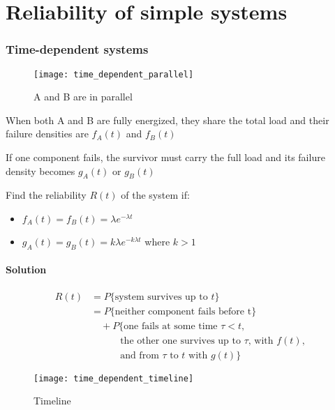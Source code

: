 
\chapter{Reliability of simple systems}

\subsection{Time-dependent systems}
\begin{figure}[!htp]
    \centering
    \texttt{[image: time\_dependent\_parallel]}
    \caption{A and B are in parallel}
\end{figure}

When both A and B are fully energized, they share the total load and their
failure densities are $f_A(t)$ and $f_B(t)$

If one component fails, the survivor must carry the full load and its failure
density becomes $g_A(t)$ or $g_B(t)$

Find the reliability $R(t)$ of the system if:  
\begin{itemize}[noitemsep,topsep=1ex]
    \item $f_A(t)=f_B(t) = \lambda e^{-\lambda t}$
    \item $g_A(t)=g_B(t)=k\lambda e^{-k\lambda t}$
    where $k>1$
\end{itemize}

\subsubsection*{Solution}
\begin{equation*}
    \begin{split}
        R(t) & = P\{\text{system survives up to $t$}\} \\
        &= P\{\text{neither component fails before t}\} \\
        &\quad+ P\{\text{one fails at some time $\tau<t$,} \\
        &\qquad \quad \text{the other one survives up to $\tau$, with $f(t)$, }\\
        &\qquad \quad \text{and from $\tau$ to $t$ with $g(t)$}\}
    \end{split}
\end{equation*}

\begin{figure}[!htp]
    \centering
    \texttt{[image: time\_dependent\_timeline]}
    \caption{Timeline}
\end{figure}

